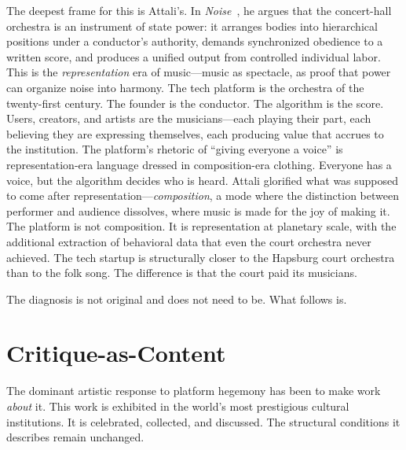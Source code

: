 \documentclass[10pt,letterpaper,twocolumn]{article}
\begin{document}
The deepest frame for this is Attali's. In \emph{Noise}~\citep{attali1985noise}, he argues that the concert-hall orchestra is an instrument of state power: it arranges bodies into hierarchical positions under a conductor's authority, demands synchronized obedience to a written score, and produces a unified output from controlled individual labor. This is the \emph{representation} era of music---music as spectacle, as proof that power can organize noise into harmony. The tech platform is the orchestra of the twenty-first century. The founder is the conductor. The algorithm is the score. Users, creators, and artists are the musicians---each playing their part, each believing they are expressing themselves, each producing value that accrues to the institution. The platform's rhetoric of ``giving everyone a voice'' is representation-era language dressed in composition-era clothing. Everyone has a voice, but the algorithm decides who is heard. Attali glorified what was supposed to come after representation---\emph{composition}, a mode where the distinction between performer and audience dissolves, where music is made for the joy of making it. The platform is not composition. It is representation at planetary scale, with the additional extraction of behavioral data that even the court orchestra never achieved. The tech startup is structurally closer to the Hapsburg court orchestra than to the folk song. The difference is that the court paid its musicians.

The diagnosis is not original and does not need to be. What follows is.

\section{Critique-as-Content}

The dominant artistic response to platform hegemony has been to make work \emph{about} it. This work is exhibited in the world's most prestigious cultural institutions. It is celebrated, collected, and discussed. The structural conditions it describes remain unchanged.
\end{document}
